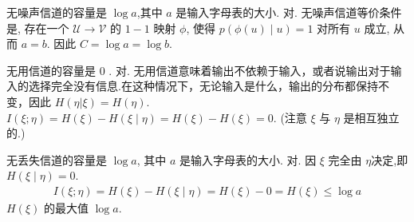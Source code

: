 \begin{tcolorbox}[breakable,colback=blue!5!white,colframe=blue!75!black,
 title= 判断题]

无噪声信道的容量是 $ \log a $,其中 $ a $ 是输入字母表的大小.
\tcblower
对. 无噪声信道等价条件是, 存在一个 $ \mathscr{U} \rightarrow \mathscr{V} $ 的 $ 1-1 $ 映射 $ \phi $, 使得 $ p(\phi(u) \mid u)=1 $ 对所有 $ u $ 成立, 从而 $ a=b $. 因此 $ C=\log a=\log b $.
\end{tcolorbox}



\begin{tcolorbox}[breakable,colback=blue!5!white,colframe=blue!75!black,
 title= 判断题]

无用信道的容量是 0 .
\tcblower
对.  无用信道意味着输出不依赖于输入，或者说输出对于输入的选择完全没有信息.在这种情况下，无论输入是什么，输出的分布都保持不变，因此 \(H(\eta | \xi) = H(\eta)\). $ I(\xi ; \eta)=H(\xi)-H(\xi \mid \eta)=H(\xi)-H(\xi)=0 $. (注意 $ \xi $ 与 $ \eta $ 是相互独立的.)
\end{tcolorbox}

\begin{tcolorbox}[breakable,colback=blue!5!white,colframe=blue!75!black,
 title= 判断题]

无丢失信道的容量是 $ \log a $, 其中 $ a $ 是输入字母表的大小.
\tcblower
对.  因  $\xi$  完全由  $\eta$决定,即 $ H(\xi \mid \eta)=0 $.
$$
\begin{aligned}
I(\xi ; \eta)  =H(\xi)-H(\xi \mid \eta)  =H(\xi)-0  =H(\xi) \leq \log a
\end{aligned}
$$
$ H(\xi) $ 的最大值 $ \log a $.
\end{tcolorbox}

